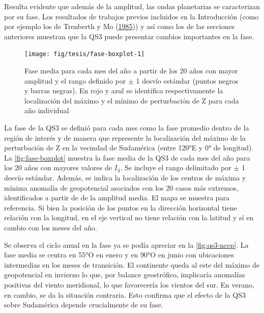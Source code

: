 \documentclass[spanish,a4paper,12pt,oneside]{book}
\begin{document}
Resulta evidente que además de la amplitud, las ondas planetarias se
caracterizan por su fase. Los resultados de trabajos previos incluidos
en la Introducción (como por ejemplo los de Trenberth y Mo
(\protect\hyperlink{ref-Trenberth1985}{1985})) y así como los de las
secciones anteriores muestran que la QS3 puede presentar cambios
importantes en la fase.

\begin{landscape}\begin{figure}

{\centering \texttt{[image: fig/tesis/fase-boxplot-1]} 

}

\caption{Fase media para cada mes del año a partir de los 20 años con mayor amplitud y el rango definido por $\pm$ 1 desvío estándar  (puntos negros y barras negras). En rojo y azul se identifica respectivamente la localización del máximo y el mínimo de perturbación de Z para cada año individual}\label{fig:fase-boxplot}
\end{figure}
\end{landscape}

La fase de la QS3 se definió para cada mes como la fase promedio dentro
de la región de interés y de manera que represente la localización del
máximo de la perturbación de Z en la vecindad de Sudamérica (entre 120°E
y 0° de longitud). La \autoref{fig:fase-boxplot} muestra la fase media
de la QS3 de cada mes del año para los 20 años con mayores valores de
\(I_3\). Se incluye el rango delimitado por \(\pm\) 1 desvío estándar.
Además, se indica la localización de los centros de máxima y mínima
anomalía de geopotencial asociados con los 20 casos más extremos,
identificados a partir de de la amplitud media. El mapa se muestra para
referencia. Si bien la posición de los puntos en la dirección horizontal
tiene relación con la longitud, en el eje vertical no tiene relación con
la latitud y sí en cambio con los meses del año.

Se observa el ciclo anual en la fase ya se podía apreciar en la
\autoref{fig:qs3-ncep}. La fase media se centra en 55°O en enero y en
90°O en junio con ubicaciones intermedias en los meses de transición. El
continente queda al este del máximo de geopotencial en invierno lo que,
por balance geostrófico, implicaría anomalías positivas del viento
meridional, lo que favorecería los vientos del sur. En verano, en
cambio, se da la situación contraria. Esto confirma que el efecto de la
QS3 sobre Sudamérica depende crucialmente de su fase.
\end{document}
